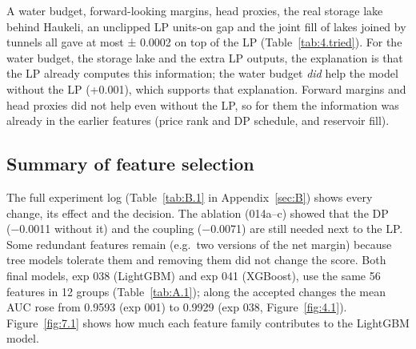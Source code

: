 \begin{disposition}
A water budget, forward-looking margins, head proxies, the real storage lake behind Haukeli, an unclipped LP units-on gap and the joint fill of lakes joined by tunnels all gave at most ± 0.0002 on top of the LP (Table~\ref{tab:4.tried}). For the water budget, the storage lake and the extra LP outputs, the explanation is that the LP already computes this information; the water budget \emph{did} help the model without the LP (+0.001), which supports that explanation. Forward margins and head proxies did not help even without the LP, so for them the information was already in the earlier features (price rank and DP schedule, and reservoir fill).
\end{disposition}



\subsection{Summary of feature selection}\label{sec:4.11}

\begin{disposition}
The full experiment log (Table~\ref{tab:B.1} in Appendix~\ref{sec:B}) shows every change, its effect and the decision. The ablation (014a--c) showed that the DP (−0.0011 without it) and the coupling (−0.0071) are still needed next to the LP. Some redundant features remain (e.g.~two versions of the net margin) because tree models tolerate them and removing them did not change the score. Both final models, exp 038 (LightGBM) and exp 041 (XGBoost), use the same 56 features in 12 groups (Table~\ref{tab:A.1}); along the accepted changes the mean AUC rose from 0.9593 (exp 001) to 0.9929 (exp 038, Figure~\ref{fig:4.1}). Figure~\ref{fig:7.1} shows how much each feature family contributes to the LightGBM model.
\end{disposition}

